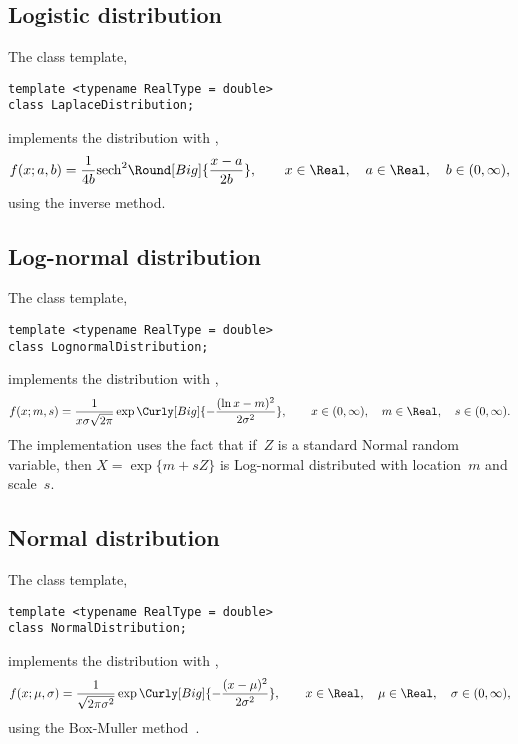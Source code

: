 \subsection{Logistic distribution}
\label{sub:Logistic distribution}

The class template,
\begin{verbatim}
template <typename RealType = double>
class LaplaceDistribution;
\end{verbatim}
implements the distribution with \pdf,
\begin{equation*}
  f(x;a,b) = \frac{1}{4b}\mathrm{sech}^2\Round[Big]{\frac{x - a}{2b}},\qquad
  x \in \Real,\quad a \in \Real,\quad b \in (0, \infty),
\end{equation*}
using the inverse method.

\subsection{Log-normal distribution}
\label{sub:Log-normal distribution}

The class template,
\begin{verbatim}
template <typename RealType = double>
class LognormalDistribution;
\end{verbatim}
implements the distribution with \pdf,
\begin{equation*}
  f(x;m,s) =
  \frac{1}{x\sigma\sqrt{2\pi}}
  \exp\Curly[Big]{-\frac{(\ln x - m)^2}{2\sigma^2}},\qquad
  x \in (0, \infty),\quad m \in \Real,\quad s \in (0, \infty).
\end{equation*}
The implementation uses the fact that if~$Z$ is a standard Normal random
variable, then $X = \exp\{m + sZ\}$ is Log-normal distributed with location~$m$
and scale~$s$.

\subsection{Normal distribution}
\label{sub:Normal distribution}

The class template,
\begin{verbatim}
template <typename RealType = double>
class NormalDistribution;
\end{verbatim}
implements the distribution with \pdf,
\begin{equation*}
  f(x;\mu,\sigma) =
  \frac{1}{\sqrt{2\pi\sigma^2}}
  \exp\Curly[Big]{-\frac{(x-\mu)^2}{2\sigma^2}},\qquad
  x \in \Real,\quad \mu \in \Real,\quad \sigma \in (0, \infty),
\end{equation*}
using the Box-Muller method~\cite{Box:1958hv}.

